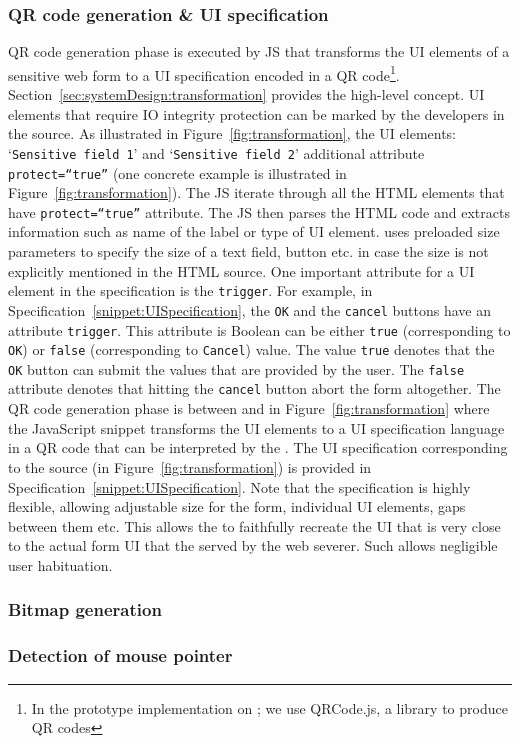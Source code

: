 \subsubsection{\bfseries QR code generation \& UI specification}
\label{sec:prototype:impl:qr}

QR code generation phase is executed by \name JS that transforms the UI elements of a sensitive web form to a UI specification encoded in a QR code\footnote{In the prototype implementation on \name; we use QRCode.js, a \js library to produce QR codes}. 
Section~\ref{sec:systemDesign:transformation} provides the high-level concept. UI elements that require IO integrity protection can be marked by the developers in the \html source. As illustrated in Figure~\ref{fig:transformation}, the \html UI elements: `\texttt{Sensitive field 1}' and `\texttt{Sensitive field 2}' additional attribute \texttt{protect=``true''} (one concrete example is illustrated in Figure~\ref{fig:transformation}). The \name JS iterate through all the HTML elements that have \texttt{protect=``true''} attribute. The JS then parses the HTML code and extracts information such as name of the label or type of UI element. \device uses preloaded size parameters to specify the size of a text field, button etc. in case the size is not explicitly mentioned in the HTML source. One important attribute for a UI element in the specification is the \texttt{trigger}. For example, in Specification~\ref{snippet:UISpecification}, the \texttt{OK} and the \texttt{cancel} buttons have an attribute \texttt{trigger}. This attribute is Boolean can be either \texttt{true} (corresponding to \texttt{OK}) or \texttt{false} (corresponding to \texttt{Cancel}) value. The value \texttt{true} denotes that the \texttt{OK} button can submit the values that are provided by the user. The \texttt{false} attribute denotes that hitting the \texttt{cancel} button abort the form altogether.
The QR code generation phase is between \one and \two in Figure~\ref{fig:transformation} where the \name JavaScript snippet transforms the UI elements to a UI specification language in a QR code that can be interpreted by the \device. The UI specification corresponding to the \html source (in Figure~\ref{fig:transformation}) is provided in Specification~\ref{snippet:UISpecification}. Note that the specification is highly flexible, allowing adjustable size for the form, individual UI elements, gaps between them etc. This allows the \device to faithfully recreate the UI that is very close to the actual form UI that the served by the web severer. Such allows negligible user habituation. 

\subsubsection{\bfseries Bitmap generation}

\subsubsection{\bfseries Detection of mouse pointer}


